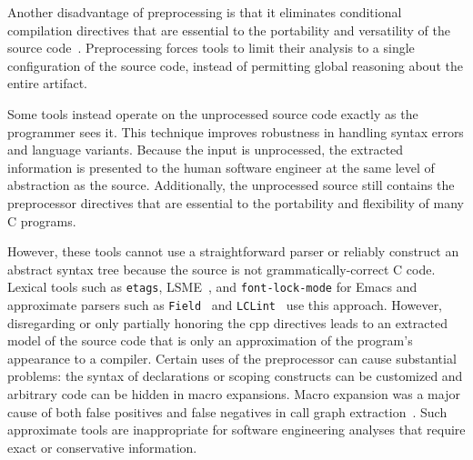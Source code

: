 \documentclass{article}
\newcommand{\Cpp}{\mbox{\textsf{cpp}}}
\newcommand{\C}{\mbox{C}}
\newcommand{\ppd}[1]{\texttt{\##1}}
\begin{document}

Another disadvantage of preprocessing is that it eliminates
conditional compilation directives that are essential to the portability
and versatility of the source code~\cite{Krone94}.  Preprocessing
forces tools to limit their analysis to a single configuration of the
source code, instead of permitting global reasoning about the entire
artifact.  

Some tools instead operate on the
unprocessed source code exactly as the programmer sees it.  This
technique improves robustness in handling syntax errors
and language variants. Because the input is unprocessed, the extracted
information is presented to the human software engineer at the same
level of abstraction as the source.  Additionally, the unprocessed
source still contains the preprocessor directives that are essential
to the portability and flexibility of many \C{} programs.

However, these tools cannot use a straightforward parser or reliably construct an
abstract syntax tree because the source is not
grammatically-correct \C{} code.  Lexical tools such as \texttt{etags},
LSME~\cite{Murphy96}, and \texttt{font-lock-mode} for Emacs and
approximate parsers such as \texttt{Field}~\cite{ReissField} and
\texttt{LCLint}~\cite{LCLint} use this approach.  However,
disregarding or only partially honoring the \Cpp{} directives leads to
an extracted model of the source code that is only an approximation of
the program's appearance to a compiler.  Certain uses of the
preprocessor can cause substantial problems:  the syntax of declarations 
or scoping constructs can be customized and arbitrary code can be hidden in macro
expansions.  Macro expansion was a
major cause of both false positives and false negatives in call graph
extraction~\cite{Griswold96}.  Such approximate tools are inappropriate
for software engineering analyses that require exact or conservative
information.
\end{document}
